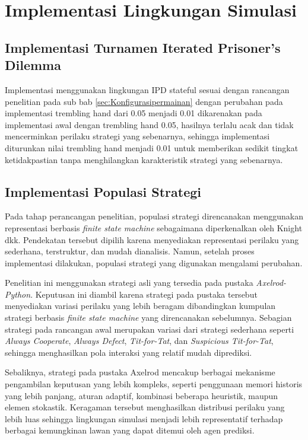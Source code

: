\section{Implementasi Lingkungan Simulasi}

\subsection{Implementasi Turnamen Iterated Prisoner's Dilemma}

Implementasi menggunakan lingkungan IPD stateful sesuai dengan rancangan penelitian pada sub bab \ref{sec:Konfigurasipermainan} dengan perubahan pada implementasi trembling hand dari 0.05 menjadi 0.01 dikarenakan pada implementasi awal dengan trembling hand 0.05, hasilnya terlalu acak dan tidak mencerminkan perilaku strategi yang sebenarnya, sehingga implementasi diturunkan nilai trembling hand menjadi 0.01 untuk memberikan sedikit tingkat ketidakpastian tanpa menghilangkan karakteristik strategi yang sebenarnya.


\subsection{Implementasi Populasi Strategi}

Pada tahap perancangan penelitian, populasi strategi direncanakan menggunakan representasi berbasis \textit{finite state machine} sebagaimana diperkenalkan oleh Knight dkk. Pendekatan tersebut dipilih karena menyediakan representasi perilaku yang sederhana, terstruktur, dan mudah dianalisis. Namun, setelah proses implementasi dilakukan, populasi strategi yang digunakan mengalami perubahan.

Penelitian ini menggunakan strategi asli yang tersedia pada pustaka \textit{Axelrod-Python}. Keputusan ini diambil karena strategi pada pustaka tersebut menyediakan variasi perilaku yang lebih beragam dibandingkan kumpulan strategi berbasis \textit{finite state machine} yang direncanakan sebelumnya. Sebagian strategi pada rancangan awal merupakan variasi dari strategi sederhana seperti \textit{Always Cooperate}, \textit{Always Defect}, \textit{Tit-for-Tat}, dan \textit{Suspicious Tit-for-Tat}, sehingga menghasilkan pola interaksi yang relatif mudah diprediksi.

Sebaliknya, strategi pada pustaka Axelrod mencakup berbagai mekanisme pengambilan keputusan yang lebih kompleks, seperti penggunaan memori historis yang lebih panjang, aturan adaptif, kombinasi beberapa heuristik, maupun elemen stokastik. Keragaman tersebut menghasilkan distribusi perilaku yang lebih luas sehingga lingkungan simulasi menjadi lebih representatif terhadap berbagai kemungkinan lawan yang dapat ditemui oleh agen prediksi.

